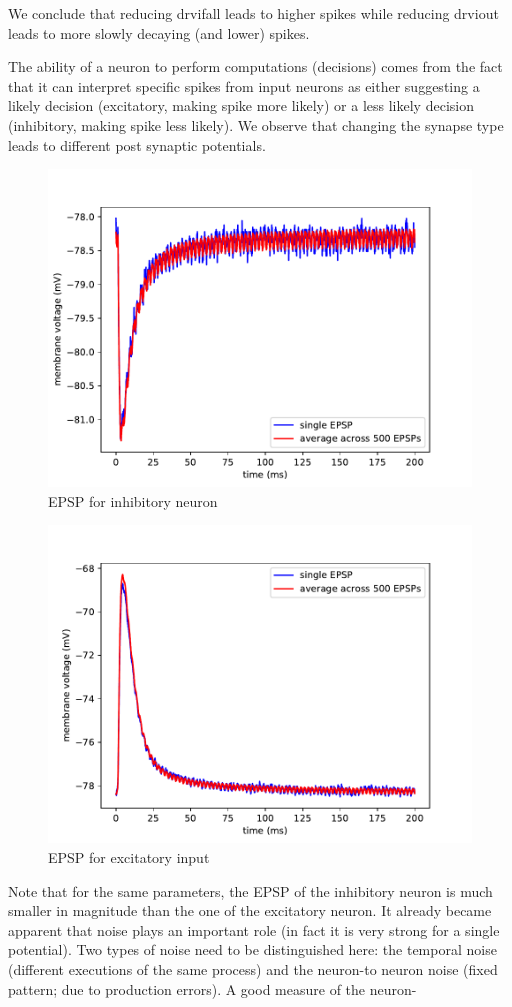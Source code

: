 \documentclass[a4paper,twocolumn]{article}
\begin{document}
We conclude that reducing drvifall leads to higher spikes while reducing drviout
leads to more slowly decaying (and lower) spikes.  \par
The ability of a neuron to perform computations (decisions) comes from the fact
that it can interpret specific spikes from input neurons as either suggesting
a likely decision (excitatory,  making spike more likely) or  a less likely decision
(inhibitory, making spike less likely).  We observe that changing the synapse type
leads to different post synaptic potentials.
\begin{figure}[ht]
    \centering
    \includegraphics[width=.5\textwidth]{figures/epsp_inh_fall_03_out_05.pdf}
    \caption{EPSP for inhibitory neuron}
    \label{fig:epsp_inh_fall}
\end{figure}
\begin{figure}[ht]
    \centering
    \includegraphics[width=.5\textwidth]{figures/epsp_exc_fall_03_out_05.pdf}
    \caption{EPSP for excitatory input}
    \label{fig:epsp_exc_fall}
\end{figure}
Note that for the same parameters,  the EPSP of the inhibitory neuron is much
smaller in magnitude than the one of the excitatory neuron.
It already became apparent that noise plays an important role (in fact it is very
strong for a single potential).  Two types of noise need to be distinguished here:
the temporal noise (different executions of the same process) and the neuron-to
neuron noise (fixed pattern; due to production errors).  A good measure of the neuron-
\end{document}
